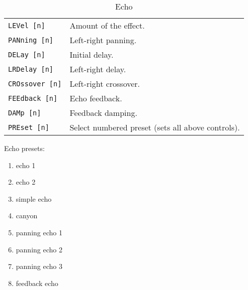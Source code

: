    \begin{table}[H]
      \centering
      \caption{Echo}
      \begin{tabular}{l l}
\texttt{LEVel [n]} &
   Amount of the effect. \\
\texttt{PANning [n]} &
   Left-right panning. \\
\texttt{DELay [n]} &
   Initial delay. \\
\texttt{LRDelay [n]} &
   Left-right delay. \\
\texttt{CROssover [n]} &
   Left-right crossover. \\
\texttt{FEEdback [n]} &
   Echo feedback. \\
\texttt{DAMp [n]} &
   Feedback damping. \\
\texttt{PREset [n]} &
   Select numbered preset (sets all above controls). \\
      \end{tabular}
   \end{table}
Echo presets:
   \begin{enumerate}
      \item echo 1
      \item echo 2
      \item simple echo
      \item canyon
      \item panning echo 1
      \item panning echo 2
      \item panning echo 3
      \item feedback echo
    \end{enumerate}

